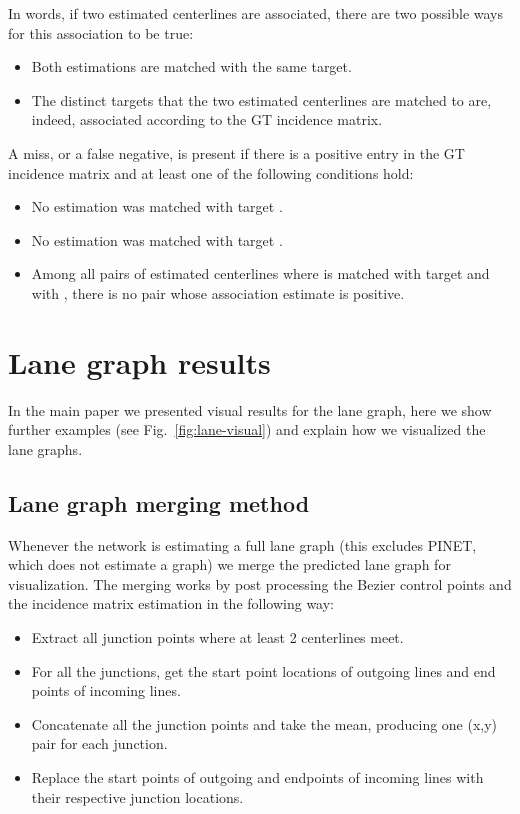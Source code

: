 \documentclass[10pt,twocolumn,letterpaper]{article}
\begin{document}
In words, if two estimated centerlines are associated, there are two possible ways for this association to be true:
\begin{itemize}
    \item Both estimations are matched with the same target.
    \item The distinct targets that the two estimated centerlines are matched to are, indeed, associated according to the GT incidence matrix.
\end{itemize}

A miss, or a false negative, is present if there is a positive entry  in the GT incidence matrix  and at least one of the following conditions hold: 
\begin{itemize}
    \item No estimation was matched with target .
    \item No estimation was matched with target .
    \item Among all pairs of estimated centerlines  where  is matched with target  and  with , there is no pair whose association estimate is positive.
\end{itemize}











\section{Lane graph results}
In the main paper we presented visual results for the lane graph, here we show further examples (see Fig.~\ref{fig:lane-visual}) and explain how we visualized the lane graphs.

\subsection{Lane graph merging method}
Whenever the network is estimating a full lane graph (this excludes PINET, which does not estimate a graph) we merge the predicted lane graph for visualization. The merging works by post processing the Bezier control points and the incidence matrix estimation in the following way:
\begin{itemize}
    \item Extract all junction points where at least 2 centerlines meet.
    \item For all the junctions, get the start point locations of outgoing lines and end points of incoming lines.
    \item Concatenate all the junction points and take the mean, producing one (x,y) pair for each junction.
    \item Replace the start points of outgoing and endpoints of incoming lines with their respective junction locations.
\end{itemize}
\end{document}
